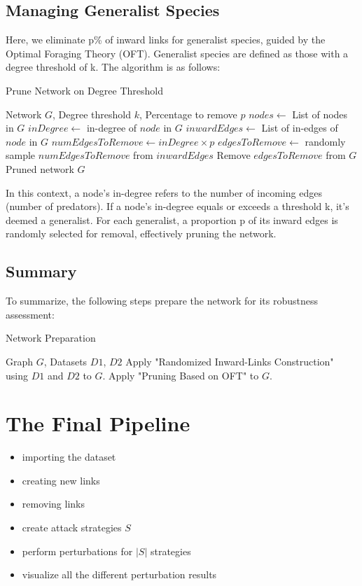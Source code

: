 \documentclass[a4paper, 12pt]{report}
\begin{document}
\section{Managing Generalist Species}

Here, we eliminate p\% of inward links for generalist species, guided by the Optimal Foraging Theory (OFT). Generalist species are defined as those with a degree threshold of k. The algorithm is as follows:


\begin{algorithm}
    \caption{Prune Network on Degree Threshold}
    \begin{algorithmic}[1]
    \small
    \Require Network $G$, Degree threshold $k$, Percentage to remove $p$
    \State $nodes \gets$ List of nodes in $G$
    \State $inDegree \gets$ in-degree of $node$ in $G$
     
    \State $inwardEdges \gets$ List of in-edges of $node$ in $G$
    \State $numEdgesToRemove \gets inDegree \times p$
    \State $edgesToRemove \gets$ randomly sample $numEdgesToRemove$ from $inwardEdges$
    \State Remove $edgesToRemove$ from $G$
    \EndIf
    \EndFor
    \Ensure Pruned network $G$
    \end{algorithmic}
    \end{algorithm}
    In this context, a node's in-degree refers to the number of incoming edges (number of predators). If a node's in-degree equals or exceeds a threshold k, it's deemed a generalist. For each generalist, a proportion p of its inward edges is randomly selected for removal, effectively pruning the network.

\section{Summary}

To summarize, the following steps prepare the network for its robustness assessment:

\begin{algorithm}
    \caption{Network Preparation}
    \begin{algorithmic}[1]
    \small
    \Require Graph $G$, Datasets $D1$, $D2$
    \State Apply "Randomized Inward-Links Construction" using $D1$ and $D2$ to $G$.
    \State Apply "Pruning Based on OFT" to $G$.
    \end{algorithmic}
\end{algorithm}


\chapter{The Final Pipeline}

\begin{itemize}
    \item importing the dataset
    \item creating new links
    \item removing links
    \item create attack strategies $S$
    \item perform perturbations for $|S|$ strategies
    \item visualize all the different perturbation results
\end{itemize}
\end{document}
